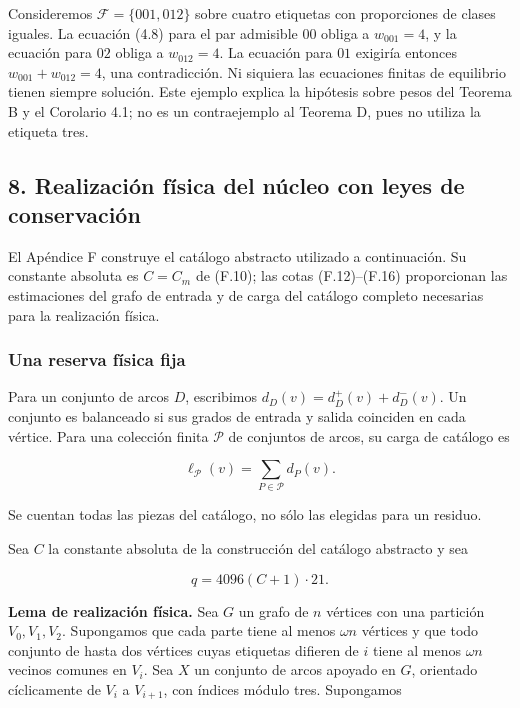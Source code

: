 \documentclass[spanish,11pt,a4paper]{article}
\begin{document}
Consideremos \(\mathcal F=\{001,012\}\) sobre cuatro etiquetas con proporciones de clases iguales. La ecuación (4.8) para el par admisible \(00\) obliga a \(w_{001}=4\), y la ecuación para \(02\) obliga a \(w_{012}=4\). La ecuación para \(01\) exigiría entonces \(w_{001}+w_{012}=4\), una contradicción. Ni siquiera las ecuaciones finitas de equilibrio tienen siempre solución. Este ejemplo explica la hipótesis sobre pesos del Teorema B y el Corolario 4.1; no es un contraejemplo al Teorema D, pues no utiliza la etiqueta tres.

\subsection{8. Realización física del núcleo con leyes de conservación}\label{realizaciuxf3n-fuxedsica-del-nuxfacleo-con-leyes-de-conservaciuxf3n}

El Apéndice F construye el catálogo abstracto utilizado a continuación. Su constante absoluta es \(C=C_m\) de (F.10); las cotas (F.12)--(F.16) proporcionan las estimaciones del grafo de entrada y de carga del catálogo completo necesarias para la realización física.

\subsubsection{Una reserva física fija}\label{una-reserva-fuxedsica-fija}

Para un conjunto de arcos \(D\), escribimos \(d_D(v)=d_D^+(v)+d_D^-(v)\). Un conjunto es balanceado si sus grados de entrada y salida coinciden en cada vértice. Para una colección finita \(\mathcal P\) de conjuntos de arcos, su carga de catálogo es

\[\ell_{\mathcal P}(v)=\sum_{P\in\mathcal P}d_P(v).\]

Se cuentan todas las piezas del catálogo, no sólo las elegidas para un residuo.

Sea \(C\) la constante absoluta de la construcción del catálogo abstracto y sea

\[q=4096(C+1)\cdot21.\]

\textbf{Lema de realización física.} Sea \(G\) un grafo de \(n\) vértices con una partición \(V_0,V_1,V_2\). Supongamos que cada parte tiene al menos \(\omega n\) vértices y que todo conjunto de hasta dos vértices cuyas etiquetas difieren de \(i\) tiene al menos \(\omega n\) vecinos comunes en \(V_i\). Sea \(X\) un conjunto de arcos apoyado en \(G\), orientado cíclicamente de \(V_i\) a \(V_{i+1}\), con índices módulo tres. Supongamos
\end{document}
